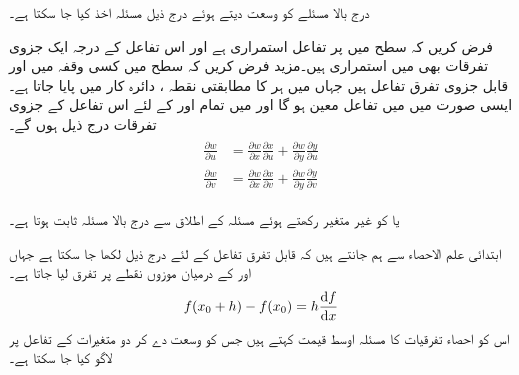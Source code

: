 درج بالا مسئلے کو وسعت دیتے ہوئے درج ذیل مسئلہ اخذ کیا جا سکتا ہے۔

فرض کریں کہ  سطح میں   پر تفاعل  استمراری ہے  اور  اس تفاعل کے درجہ ایک جزوی تفرقات بھی  میں استمراری ہیں۔مزید فرض کریں کہ  سطح میں کسی وقفہ  میں  اور  قابل جزوی تفرق تفاعل ہیں جہاں  میں ہر  کا مطابقتی نقطہ ، دائرہ کار  میں پایا جاتا ہے۔ایسی صورت میں  میں تفاعل   معین ہو گا اور  میں تمام  اور  کے لئے اس تفاعل کے جزوی تفرقات  درج ذیل ہوں گے۔
\begin{gather}
\begin{aligned}
\frac{\partial w}{\partial u}&=\frac{\partial w}{\partial x}\frac{\partial x}{\partial u}+\frac{\partial w}{\partial y}\frac{\partial y}{\partial u}\\
\frac{\partial w}{\partial v}&=\frac{\partial w}{\partial x}\frac{\partial x}{\partial v}+\frac{\partial w}{\partial y}\frac{\partial y}{\partial v}
\end{aligned}
\end{gather}

 یا  کو غیر متغیر رکھتے ہوئے مسئلہ  کے اطلاق سے  درج بالا مسئلہ ثابت ہوتا ہے۔

ابتدائی علم الاحصاء  سے ہم جانتے ہیں کہ قابل تفرق تفاعل  کے لئے درج ذیل لکھا جا سکتا ہے جہاں  اور  کے درمیان موزوں نقطے پر تفرق لیا جاتا ہے۔
\begin{align*}
f(x_0+h)-f(x_0)=h\frac{\dif f}{\dif x}
\end{align*}
اس کو احصاء تفرقیات کا مسئلہ اوسط قیمت کہتے ہیں جس کو  وسعت دے کر  دو متغیرات کے تفاعل پر لاگو  کیا جا سکتا ہے۔

